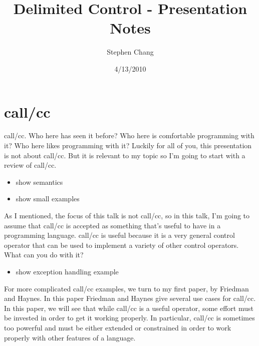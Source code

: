 \documentclass[letterpaper]{llncs}
\begin{document}

\title{Delimited Control - Presentation Notes}
\author{Stephen Chang}
\institute{}
\date{4/13/2010}
\maketitle

\section*{call/cc}

call/cc. Who here has seen it before? Who here is comfortable programming with it? Who here likes programming with it? Luckily for all of you, this presentation is not about call/cc. But it is relevant to my topic so I'm going to start with a review of call/cc.

\begin{itemize}
	\item show semantics
	\item show small examples
\end{itemize}

As I mentioned, the focus of this talk is not call/cc, so in this talk, I'm going to assume that call/cc is accepted as something that's useful to have in a programming language. call/cc is useful because it is a very general control operator that can be used to implement a variety of other control operators. What can you do with it?

\begin{itemize}
	\item show exception handling example
\end{itemize}

For more complicated call/cc examples, we turn to my first paper, by Friedman and Haynes. In this paper Friedman and Haynes give several use cases for call/cc. In this paper, we will see that while call/cc is a useful operator, some effort must be invested in order to get it working properly. In particular, call/cc is sometimes too powerful and must be either extended or constrained in order to work properly with other features of a language.


\end{document}
